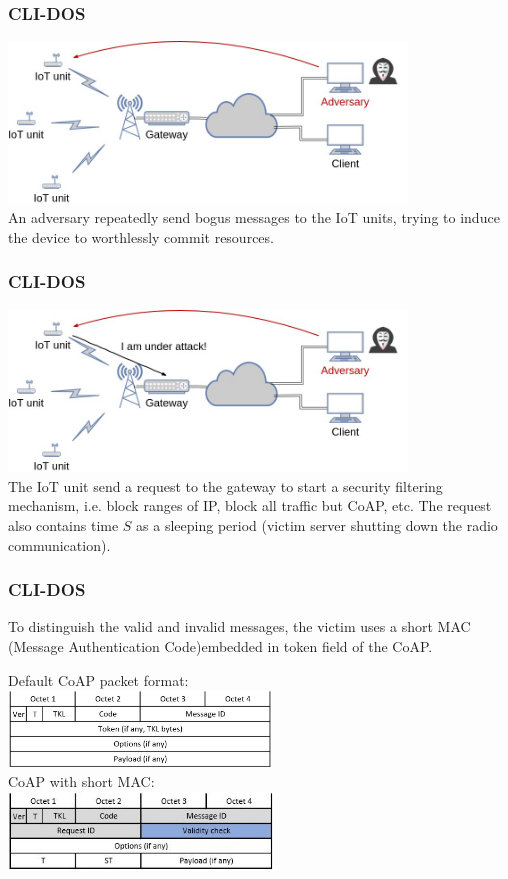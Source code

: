 \documentclass{beamer}
\begin{document}
\begin{frame}
\frametitle{CLI-DOS}
\includegraphics[height=4.3cm]{gambar/adv.jpg}
\\
An adversary repeatedly send bogus messages to the IoT units, trying to induce the device to worthlessly commit resources.  
\end{frame}

\begin{frame}
\frametitle{CLI-DOS}
\includegraphics[height=4.3cm]{gambar/inform.jpg}
\\
The IoT unit send a request to the gateway to start a security filtering mechanism, i.e. block ranges of IP, block all traffic but CoAP, etc. The request also contains time $S$ as a sleeping period (victim server shutting down the radio communication).   
\end{frame}

\begin{frame}
\frametitle{CLI-DOS}
To distinguish the valid and invalid messages, the victim uses a short MAC (Message Authentication Code)\footnotemark embedded in token field of the CoAP.

Default CoAP packet format: \\
\includegraphics[height=2.05cm]{gambar/coap_format.jpg} \\

CoAP with short MAC: \\
\includegraphics[height=2.1cm]{gambar/coap_adaptive.jpg}

\end{frame}
\end{document}
